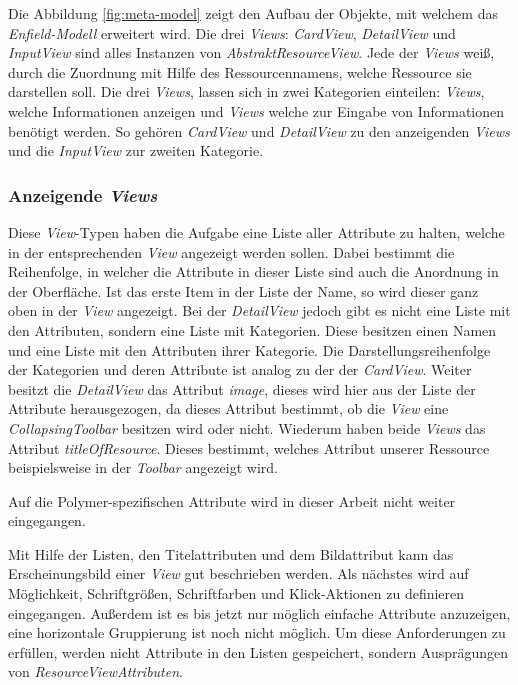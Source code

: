 Die Abbildung \ref{fig:meta-model} zeigt den Aufbau der Objekte, mit welchem das \textit{Enfield-Modell} erweitert wird. Die drei \textit{Views}: \textit{CardView}, \textit{DetailView} und \textit{InputView} sind alles Instanzen von \textit{AbstraktResourceView}. Jede der \textit{Views} weiß, durch die Zuordnung mit Hilfe des Ressourcennamens, welche Ressource sie darstellen soll. Die drei \textit{Views}, lassen sich in zwei Kategorien einteilen: \textit{Views}, welche Informationen anzeigen und \textit{Views} welche zur Eingabe von Informationen benötigt werden.
So gehören \textit{CardView} und \textit{DetailView} zu den anzeigenden \textit{Views} und die \textit{InputView} zur zweiten Kategorie. 

\subsubsection{Anzeigende \textit{Views}}
Diese \textit{View}-Typen haben die Aufgabe eine Liste aller Attribute zu halten, welche in der entsprechenden \textit{View} angezeigt werden sollen. Dabei bestimmt die Reihenfolge, in welcher die Attribute in dieser Liste sind auch die Anordnung in der Oberfläche. Ist das erste Item in der Liste der Name, so wird dieser ganz oben in der \textit{View} angezeigt.
Bei der \textit{DetailView} jedoch gibt es nicht eine Liste mit den Attributen, sondern eine Liste mit Kategorien. Diese besitzen 
einen Namen und eine Liste mit den Attributen ihrer Kategorie. Die Darstellungsreihenfolge der Kategorien und deren Attribute ist analog zu der der \textit{CardView}. Weiter besitzt die \textit{DetailView} das Attribut \textit{image}, dieses wird hier aus der Liste der Attribute herausgezogen, da dieses Attribut bestimmt, ob die \textit{View} eine \textit{CollapsingToolbar} besitzen wird oder nicht. Wiederum haben beide \textit{Views} das Attribut \textit{titleOfResource}. Dieses bestimmt, welches Attribut unserer Ressource beispielsweise in der \textit{Toolbar} angezeigt wird.

Auf die Polymer-spezifischen Attribute wird in dieser Arbeit nicht weiter eingegangen.

Mit Hilfe der Listen, den Titelattributen und dem Bildattribut kann das Erscheinungsbild einer \textit{View} gut beschrieben werden. Als nächstes wird auf Möglichkeit, Schriftgrößen, Schriftfarben und Klick-Aktionen zu definieren eingegangen.
Außerdem ist es bis jetzt nur möglich einfache Attribute anzuzeigen, eine horizontale Gruppierung ist noch nicht möglich. Um diese Anforderungen zu erfüllen, werden nicht Attribute in den Listen gespeichert, sondern Ausprägungen von \textit{ResourceViewAttributen}. 

